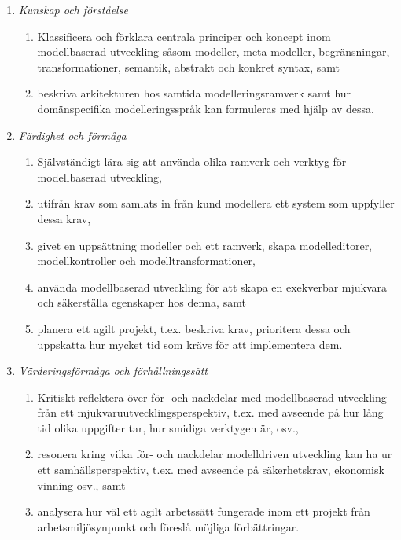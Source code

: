 \begin{enumerate}
\def\labelenumi{\Alph{enumi}.}
\tightlist
\item
  \emph{Kunskap och förståelse}

  \begin{enumerate}
  \def\labelenumii{\Alph{enumi}.\arabic{enumii}.}
  \tightlist
  \item
    Klassificera och förklara centrala principer och koncept inom
    modellbaserad utveckling såsom modeller, meta-modeller,
    begränsningar, transformationer, semantik, abstrakt och konkret
    syntax, samt
  \item
    beskriva arkitekturen hos samtida modelleringsramverk samt hur
    domänspecifika modelleringsspråk kan formuleras med hjälp av dessa.
  \end{enumerate}
\item
  \emph{Färdighet och förmåga}

  \begin{enumerate}
  \def\labelenumii{\Alph{enumi}.\arabic{enumii}.}
  \tightlist
  \item
    Självständigt lära sig att använda olika ramverk och verktyg för
    modellbaserad utveckling,
  \item
    utifrån krav som samlats in från kund modellera ett system som
    uppfyller dessa krav,
  \item
    givet en uppsättning modeller och ett ramverk, skapa modelleditorer,
    modellkontroller och modelltransformationer,
  \item
    använda modellbaserad utveckling för att skapa en exekverbar
    mjukvara och säkerställa egenskaper hos denna, samt
  \item
    planera ett agilt projekt, t.ex. beskriva krav, prioritera dessa och
    uppskatta hur mycket tid som krävs för att implementera dem.
  \end{enumerate}
\item
  \emph{Värderingsförmåga och förhållningssätt}

  \begin{enumerate}
  \def\labelenumii{\Alph{enumi}.\arabic{enumii}.}
  \tightlist
  \item
    Kritiskt reflektera över för- och nackdelar med modellbaserad
    utveckling från ett mjukvaruutvecklingsperspektiv, t.ex. med
    avseende på hur lång tid olika uppgifter tar, hur smidiga verktygen
    är, osv.,
  \item
    resonera kring vilka för- och nackdelar modelldriven utveckling kan
    ha ur ett samhällsperspektiv, t.ex. med avseende på säkerhetskrav,
    ekonomisk vinning osv., samt
  \item
    analysera hur väl ett agilt arbetssätt fungerade inom ett projekt
    från arbetsmiljösynpunkt och föreslå möjliga förbättringar.
  \end{enumerate}
\end{enumerate}

